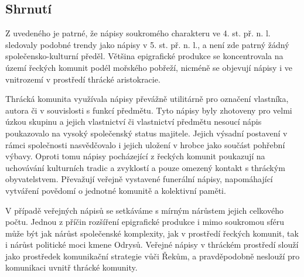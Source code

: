 
\subsection[shrnutí-7]{Shrnutí}

Z uvedeného je patrné, že nápisy soukromého charakteru ve 4. st. př. n. l. sledovaly podobné trendy jako nápisy v 5. st. př. n. l., a není zde patrný žádný společensko-kulturní předěl. Většina epigrafické produkce se koncentrovala na území řeckých komunit podél mořského pobřeží, nicméně se objevují nápisy i ve vnitrozemí v prostředí thrácké aristokracie.

Thrácká komunita využívala nápisy převážně utilitárně pro označení vlastníka, autora či v souvislosti s funkcí předmětu. Tyto nápisy byly zhotoveny pro velmi úzkou skupinu a jejich vlastnictví či vlastnictví předmětu nesoucí nápis poukazovalo na vysoký společenský status majitele. Jejich výsadní postavení v rámci společnosti nasvědčovalo i jejich uložení v hrobce jako součást pohřební výbavy. Oproti tomu nápisy pocházející z řeckých komunit poukazují na uchovávání kulturních tradic a zvyklostí a pouze omezený kontakt s thráckým obyvatelstvem. Převažují veřejně vystavené funerální nápisy, napomáhající vytváření povědomí o jednotné komunitě a kolektivní paměti.

V případě veřejných nápisů se setkáváme s mírným nárůstem jejich celkového počtu. Jednou z příčin rozšíření epigrafické produkce i mimo soukromou sféru může být jak nárůst společenské komplexity, jak v prostředí řeckých komunit, tak i nárůst politické moci kmene Odrysů. Veřejné nápisy v thráckém prostředí slouží jako prostředek komunikační strategie vůči Řekům, a pravděpodobně neslouží pro komunikaci uvnitř thrácké komunity.

